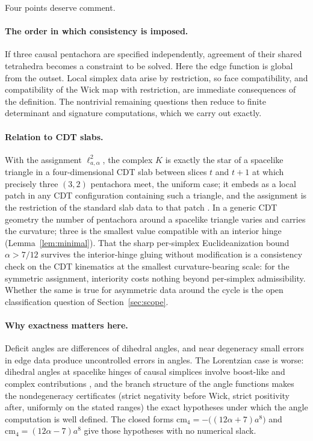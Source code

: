 \documentclass[11pt]{article}
\theoremstyle{definition}
\theoremstyle{remark}
\newcommand{\cm}{\mathrm{cm}_{4}}
\newcommand{\Kmin}{K}
\newcommand{\ltwo}{\ell^{2}_{a,\alpha}}
\begin{document}
Four points deserve comment.

\paragraph{The order in which consistency is imposed.}
If three causal pentachora are specified independently, agreement of their shared tetrahedra becomes a constraint to be solved. Here the edge function is global from the outset. Local simplex data arise by restriction, so face compatibility, and compatibility of the Wick map with restriction, are immediate consequences of the definition. The nontrivial remaining questions then reduce to finite determinant and signature computations, which we carry out exactly.

\paragraph{Relation to CDT slabs.}
With the assignment $\ltwo$, the complex $\Kmin$ is exactly the star of a spacelike triangle in a four-dimensional CDT slab between slices $t$ and $t+1$ at which precisely three $(3,2)$ pentachora meet, the uniform case; it embeds as a local patch in any CDT configuration containing such a triangle, and the assignment is the restriction of the standard slab data to that patch \cite{AJL,Loll}. In a generic CDT geometry the number of pentachora around a spacelike triangle varies and carries the curvature; three is the smallest value compatible with an interior hinge (Lemma~\ref{lem:minimal}). That the sharp per-simplex Euclideanization bound $\alpha>7/12$ survives the interior-hinge gluing without modification is a consistency check on the CDT kinematics at the smallest curvature-bearing scale: for the symmetric assignment, interiority costs nothing beyond per-simplex admissibility. Whether the same is true for asymmetric data around the cycle is the open classification question of Section~\ref{sec:scope}.

\paragraph{Why exactness matters here.}
Deficit angles are differences of dihedral angles, and near degeneracy small errors in edge data produce uncontrolled errors in angles. The Lorentzian case is worse: dihedral angles at spacelike hinges of causal simplices involve boost-like and complex contributions \cite{Sorkin1975,SorkinAngles,Barrett,BarrettFoxon}, and the branch structure of the angle functions makes the nondegeneracy certificates (strict negativity before Wick, strict positivity after, uniformly on the stated ranges) the exact hypotheses under which the angle computation is well defined. The closed forms $\cm=-\bigl((12\alpha+7)a^{8}\bigr)$ and $\cm=(12\alpha-7)a^{8}$ give those hypotheses with no numerical slack.
\end{document}
